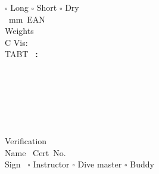 \documentclass[a5paper,14pt]{extarticle}
\begin{document}
{\begin{minipage}{0.58\linewidth}
  \end{minipage}
  \quad
  \begin{minipage}{0.38\linewidth}
    \vspace{1em}
    \noindent
    \centering
    $\square$ Long $\square$ Short $\square$ Dry \\
    \phantom{}\hrulefill\ mm~EAN\hrulefill\\
    Weights \hrulefill\\
    {\Large {}}\textdegree C \hrulefill Vis: \hrulefill\\
    TABT \hrulefill~\textbf{:}~\hrulefill\\
  \end{minipage}

  \vspace{4em}
  \noindent
  \phantom{}\hrulefill\\
  \phantom{}\hrulefill\\
  \phantom{}\hrulefill\\
  \phantom{}\hrulefill\\
  \phantom{}\hrulefill\\\vspace{-3em}
  \begin{tcolorbox}
    {\vspace{-.5em}\footnotesize \textcolor{grayedcaption}{Verification}}\vspace{-1em}\\
    Name \hrulefill\ Cert~No.~\hrulefill\\
    Sign \hrulefill~$\square$ Instructor $\square$ Dive master $\square$ Buddy
  \end{tcolorbox}
  \clearpage
}
\end{document}
